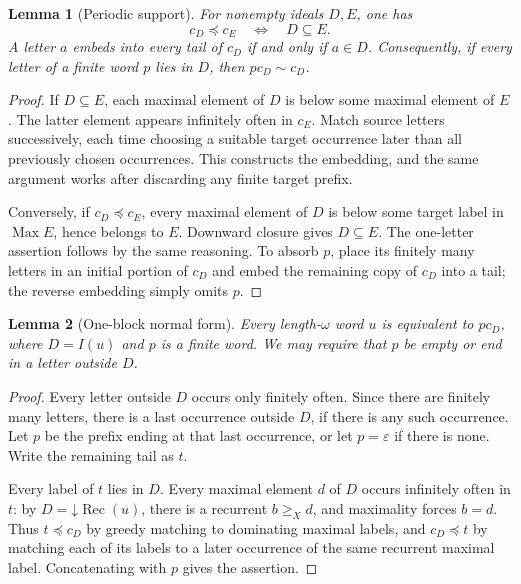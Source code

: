 \documentclass[11pt]{article}
\numberwithin{equation}{section}
\theoremstyle{plain}
\newtheorem{lemma}[lemma]{Lemma}
\theoremstyle{definition}
\theoremstyle{remark}
\newcommand{\emp}{\varepsilon}
\newcommand{\Max}{\operatorname{Max}}
\newcommand{\rec}{\operatorname{Rec}}
\newcommand{\down}{\mathord\downarrow}
\newcommand{\sub}{\preccurlyeq}
\newcommand{\equ}{\sim}
\begin{document}
\begin{lemma}[Periodic support]\label{lem:periodic}
For nonempty ideals $D,E$, one has
\begin{equation}\label{eq:periodic}
 c_D\sub c_E\quad\Longleftrightarrow\quad D\subseteq E.
\end{equation}
A letter $a$ embeds into every tail of $c_D$ if and only if $a\in D$. Consequently, if every letter of a finite word $p$ lies in $D$, then $p c_D\equ c_D$.
\end{lemma}
\begin{proof}
If $D\subseteq E$, each maximal element of $D$ is below some maximal element of $E$. The latter element appears infinitely often in $c_E$. Match source letters successively, each time choosing a suitable target occurrence later than all previously chosen occurrences. This constructs the embedding, and the same argument works after discarding any finite target prefix.

Conversely, if $c_D\sub c_E$, every maximal element of $D$ is below some target label in $\Max E$, hence belongs to $E$. Downward closure gives $D\subseteq E$. The one-letter assertion follows by the same reasoning. To absorb $p$, place its finitely many letters in an initial portion of $c_D$ and embed the remaining copy of $c_D$ into a tail; the reverse embedding simply omits $p$.
\end{proof}

\begin{lemma}[One-block normal form]\label{lem:oneblock}
Every length-$\omega$ word $u$ is equivalent to $p c_D$, where $D=I(u)$ and $p$ is a finite word. We may require that $p$ be empty or end in a letter outside $D$.
\end{lemma}
\begin{proof}
Every letter outside $D$ occurs only finitely often. Since there are finitely many letters, there is a last occurrence outside $D$, if there is any such occurrence. Let $p$ be the prefix ending at that last occurrence, or let $p=\emp$ if there is none. Write the remaining tail as $t$.

Every label of $t$ lies in $D$. Every maximal element $d$ of $D$ occurs infinitely often in $t$: by $D=\down\rec(u)$, there is a recurrent $b\geq_X d$, and maximality forces $b=d$. Thus $t\sub c_D$ by greedy matching to dominating maximal labels, and $c_D\sub t$ by matching each of its labels to a later occurrence of the same recurrent maximal label. Concatenating with $p$ gives the assertion.
\end{proof}
\end{document}
